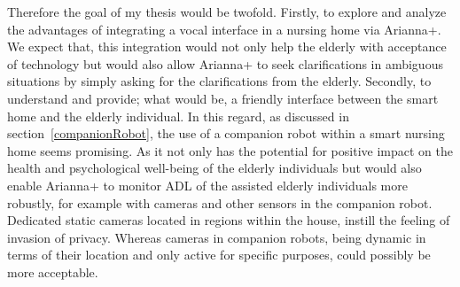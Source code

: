 \documentclass{thesisreport}
\begin{document}
Therefore the goal of my thesis would be twofold. 
Firstly, to explore and analyze the advantages of integrating a vocal interface in a nursing home via Arianna+. We expect that, this integration would not only help the elderly with acceptance of technology but would also allow Arianna+ to seek clarifications in ambiguous situations by simply asking for the clarifications from the elderly. 
Secondly, to understand and provide; what would be, a friendly interface between the smart home and the elderly individual. In this regard, as discussed in section~\ref{companionRobot}, the use of a companion robot within a smart nursing home seems promising. As it not only has the potential for positive impact on the health and psychological well-being of the elderly individuals but would also enable Arianna+ to monitor ADL of the assisted elderly individuals more robustly, for example with cameras and other sensors in the companion robot. Dedicated static cameras located in regions within the house, instill the feeling of invasion of privacy. Whereas cameras in companion robots, being dynamic in terms of their location and only active for specific purposes, could possibly be more acceptable.
 
 
 
 
 
 
 
 
 
\end{document}
